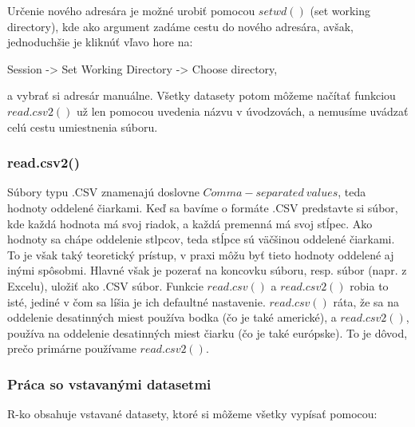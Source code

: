 Určenie nového adresára je možné urobiť pomocou \(setwd()\) (set working
directory), kde ako argument zadáme cestu do nového adresára, avšak,
jednoduchšie je kliknúť vľavo hore na:

\begin{center}

Session -\textgreater{} Set Working Directory -\textgreater{} Choose
directory,

\end{center}

a vybrať si adresár manuálne. Všetky datasety potom môžeme načítať
funkciou \(read.csv2()\) už len pomocou uvedenia názvu v úvodzovách, a
nemusíme uvádzať celú cestu umiestnenia súboru.

\hypertarget{read.csv2}{%
\subsubsection{read.csv2()}\label{read.csv2}}

Súbory typu .CSV znamenajú doslovne \(Comma-separated \ values\), teda
hodnoty oddelené čiarkami. Keď sa bavíme o formáte .CSV predstavte si
súbor, kde každá hodnota má svoj riadok, a každá premenná má svoj
stĺpec. Ako hodnoty sa chápe oddelenie stlpcov, teda stĺpce sú väčšinou
oddelené čiarkami. To je však taký teoretický prístup, v praxi môžu byť
tieto hodnoty oddelené aj inými spôsobmi. Hlavné však je pozerať na
koncovku súboru, resp. súbor (napr. z Excelu), uložiť ako .CSV súbor.
Funkcie \(read.csv()\) a \(read.csv2()\) robia to isté, jediné v čom sa
líšia je ich defaultné nastavenie. \(read.csv()\) ráta, že sa na
oddelenie desatinných miest používa bodka (čo je také americké), a
\(read.csv2()\), používa na oddelenie desatinných miest čiarku (čo je
také európske). To je dôvod, prečo primárne používame \(read.csv2()\).

\hypertarget{pruxe1ca-so-vstavanuxfdmi-datasetmi}{%
\subsubsection{Práca so vstavanými
datasetmi}\label{pruxe1ca-so-vstavanuxfdmi-datasetmi}}

R-ko obsahuje vstavané datasety, ktoré si môžeme všetky vypísať pomocou:

\begin{Shaded}
\begin{Highlighting}[]
\NormalTok{()}
\end{Highlighting}
\end{Shaded}

